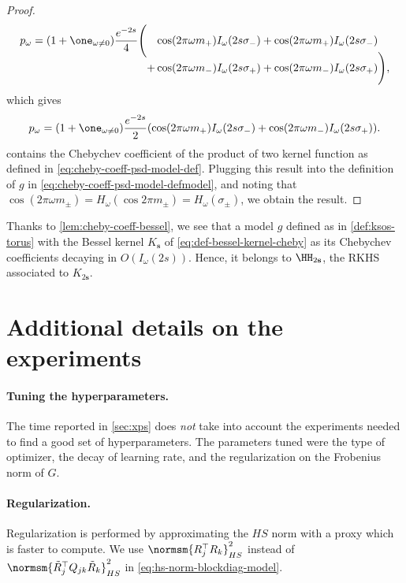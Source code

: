 \documentclass{article}
\begin{document}
\begin{proof}
  \begin{equation*}
    p_\omega = (1 + \one_{\omega \neq 0}) \frac{e^{-2s}}{4} \Biggl(
    \begin{aligned}[t]
        & \cos(2\pi \omega m_+) I_{\omega}(2s \sigma_-)
      + \cos(2\pi \omega m_+) I_{\omega}(2s \sigma_-)   \\
      + & \cos(2\pi \omega m_-) I_{\omega}(2s \sigma_+)
      + \cos(2\pi \omega m_-) I_{\omega}(2s \sigma_+)\Biggr),
    \end{aligned}
  \end{equation*}
  which gives
  \begin{equation}\label{eq:cheby-coeff-psd-model-end}
    p_\omega = (1 + \one_{\omega \neq 0}) \frac{e^{-2s}}{2} (\cos(2\pi \omega m_+) I_{\omega}(2s \sigma_-) + \cos(2\pi \omega m_-) I_{\omega}(2s \sigma_+)).
  \end{equation}
   contains the Chebychev coefficient of the product of two kernel function as defined in \cref{eq:cheby-coeff-psd-model-def}. Plugging this result into the definition of $g$ in \cref{eq:cheby-coeff-psd-model-defmodel}, and noting that $\cos(2\pi \omega m_\pm) = H_\omega(\cos 2\pi m_\pm) = H_\omega(\sigma_\pm)$, we obtain the result.
\end{proof}

Thanks to \cref{lem:cheby-coeff-bessel}, we see that a model $g$ defined as in \cref{def:ksos-torus} with the Bessel kernel $K_{\mathbf{s}}$ of \cref{eq:def-bessel-kernel-cheby} as its Chebychev coefficients decaying in $O(I_\omega(2s))$. Hence, it belongs to $\HH_{2\mathbf{s}}$, the RKHS associated to $K_{2 \mathbf{s}}$.

\section{Additional details on the experiments}
\label{sec:xps-appendix}

\paragraph{Tuning the hyperparameters.}
The time reported in \cref{sec:xps} does \emph{not} take into account the experiments needed to find a good set of hyperparameters. The parameters tuned were the type of optimizer, the decay of learning rate, and the regularization on the Frobenius norm of $G$.

\paragraph{Regularization.}
Regularization is performed by approximating the $HS$ norm with a proxy which is faster to compute. We use $\normsm{R_j^\top R_k}_{HS}^2$ instead of $\normsm{\tilde{R}_j^\top Q_{jk} \tilde{R}_k}_{HS}^2$ in \cref{eq:hs-norm-blockdiag-model}.
\end{document}
